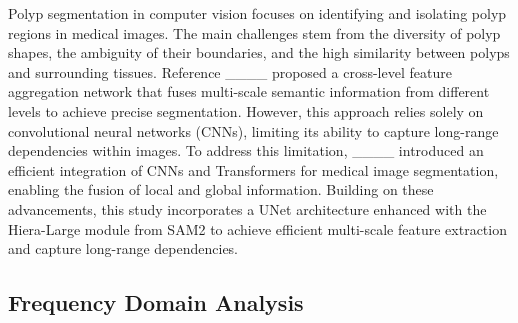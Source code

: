 Polyp segmentation in computer vision focuses on identifying and isolating polyp regions in medical images. The main challenges stem from the diversity of polyp shapes, the ambiguity of their boundaries, and the high similarity between polyps and surrounding tissues. Reference ____ proposed a cross-level feature aggregation network that fuses multi-scale semantic information from different levels to achieve precise segmentation. However, this approach relies solely on convolutional neural networks (CNNs), limiting its ability to capture long-range dependencies within images.
To address this limitation, ____ introduced an efficient integration of CNNs and Transformers for medical image segmentation, enabling the fusion of local and global information. Building on these advancements, this study incorporates a UNet architecture enhanced with the Hiera-Large module from SAM2 to achieve efficient multi-scale feature extraction and capture long-range dependencies.

\subsection{Frequency Domain Analysis}

